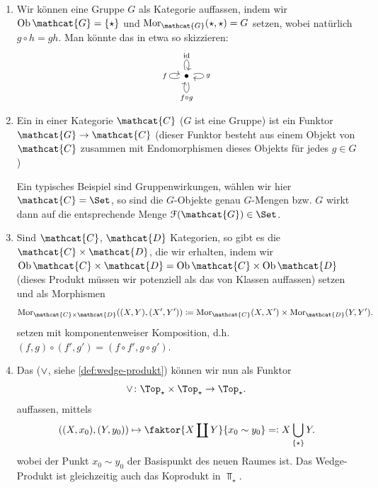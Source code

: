 \begin{example}\label{ex:mehr-kategorien:gruppen-produkte-wedge-smash-einhängung-funktorkategorie}
    \begin{enumerate}[1)]
        \item Wir können eine Gruppe $G$ als Kategorie auffassen, indem wir  $\Ob{\mathcat{G}} = \left \{\star\right\} $ und $\Mor_{\mathcat{G}}(\star,\star) = G$ setzen, wobei natürlich $g \circ  h = gh$. Man könnte das in etwa so skizzieren:
            \[
\begin{tikzcd}
            \bullet \ar[loop left]{}{f} \ar[loop above]{}{\id} \ar[loop right]{}{g} \ar[loop below]{}{f \circ g}
\end{tikzcd}
\]
\item Ein  in einer Kategorie $\mathcat{C}$ ($G$ ist eine Gruppe) ist ein Funktor  $\mathcat{G} \to  \mathcat{C}$ (dieser Funktor besteht aus einem Objekt von $\mathcat{C}$ zusammen mit Endomorphismen dieses Objekts für jedes $g\in G$)
    \begin{remark*}
        Ein typisches Beispiel sind Gruppenwirkungen, wählen wir hier $\mathcat{C} = \Set$, so sind die $G$-Objekte genau  $G$-Mengen bzw.  $G$ wirkt dann auf die entsprechende Menge  $\mathcal{F}(\mathcat{G})\in \Set$.
    \end{remark*}
\item Sind $\mathcat{C}$, $\mathcat{D}$ Kategorien, so gibt es die  $\mathcat{C} \times  \mathcat{D}$, die wir erhalten, indem wir $\Ob{\mathcat{C} \times \mathcat{D}} = \Ob{\mathcat{C}} \times \Ob{\mathcat{D}} $ (dieses Produkt müssen wir potenziell als das von Klassen auffassen) setzen und als Morphismen
    \[
        \Mor_{\mathcat{C}\times \mathcat{D}}((X,Y),(X',Y')) \coloneqq  \Mor_{\mathcat{C}}(X,X') \times \Mor_{\mathcat{D}}(Y,Y') 
    .\] 
    setzen mit komponentenweiser Komposition, d.h. $(f,g) \circ  (f', g') = (f \circ  f', g \circ  g')$.
\item Das  ($\vee$, siehe \autoref{def:wedge-produkt}) können wir nun als Funktor
     \[
    \twedge \colon \Top_{\star} \times \Top_{\star} \to  \Top_{\star}
    .\] 
    auffassen, mittels
    \[
        ((X,x_0),(Y,y_0)) \mapsto \faktor{X \coprod Y}{x_0 \sim  y_0} =\vcentcolon X \bigcup_{\left \{\star\right\} } Y 
    .\] 
    wobei der Punkt $x_0 \sim y_0$ der Basispunkt des neuen Raumes ist. Das Wedge-Produkt ist gleichzeitig auch das Koprodukt in $\Top_{\star}$.



\end{enumerate}
\end{example}
